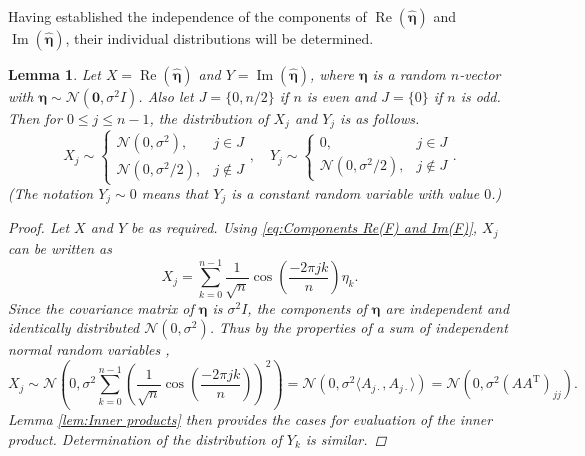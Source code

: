 \documentclass[12pt,notitlepage]{report}
\newcommand{\trans}{\mathrm{T}}	%
\newcommand{\noise}{\eta}	%
\newcommand{\noiseSD}{\sigma}	%
\newcommand{\noiseVec}{\bm{\noise}}	%
\renewcommand{\Re}{\operatorname{Re}}	%
\renewcommand{\Im}{\operatorname{Im}}	%
\newtheorem{lemma}{Lemma}[section]
\begin{document}
Having established the independence of the components of $\Re(\widehat{\noiseVec})$ and $\Im(\widehat{\noiseVec})$, their individual distributions will be determined. 

\begin{lemma}
\label{lem:Component distributions}
Let $X = \Re(\widehat{\noiseVec})$ and $Y = \Im(\widehat{\noiseVec})$, where $\noiseVec$ is a random $n$-vector with $\noiseVec \sim \mathcal{N}(\bm{0},\noiseSD^2 I)$. Also let $J = \{0,n/2\}$ if $n$ is even and $J = \{0\}$ if $n$ is odd. Then for $0 \leq j \leq n-1$, the distribution of $X_j$ and $Y_j$ is as follows.  
\[X_j \sim \begin{cases}
\mathcal{N}(0,\noiseSD^2), & j \in J \\
\mathcal{N}(0,\noiseSD^2/2), & j \not\in J \end{cases}, \quad Y_j \sim \begin{cases}
0, & j \in J \\
\mathcal{N}(0,\noiseSD^2/2), & j \not\in J
\end{cases}.\]
(The notation $Y_j \sim 0$ means that $Y_j$ is a constant random variable with value $0$.)
\begin{proof}
Let $X$ and $Y$ be as required. Using \eqref{eq:Components Re(F) and Im(F)}, $X_j$ can be written as
\[X_j = \sum_{k=0}^{n-1} \frac{1}{\sqrt{n}}\cos\left(\frac{-2\pi{jk}}{n}\right)\noise_k.\]
Since the covariance matrix of $\noiseVec$ is $\noiseSD^2 I$, the components of $\noiseVec$ are independent and identically distributed $\mathcal{N}(0,\noiseSD^2)$. Thus by the properties of a sum of independent normal random variables \cite[p.~184]{CasellaBerger02},
\[X_j \sim \mathcal{N}\left(0, \noiseSD^2\sum_{k=0}^{n-1} \left(\frac{1}{\sqrt{n}}\cos\left(\frac{-2\pi{jk}}{n}\right)\right)^2\right) = \mathcal{N}\left(0, \noiseSD^2 \langle A_{j\cdot},A_{j\cdot} \rangle\right) = \mathcal{N}\left(0, \noiseSD^2 (AA^\trans)_{jj}\right).\]
Lemma \ref{lem:Inner products} then provides the cases for evaluation of the inner product. Determination of the distribution of $Y_k$ is similar.
\end{proof}
\end{lemma}
\end{document}
